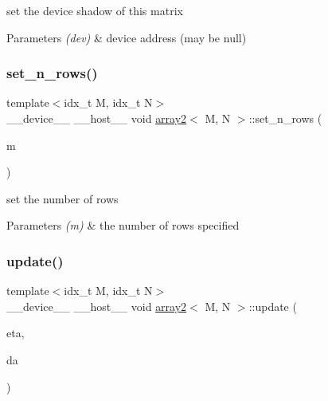set the device shadow of this matrix 


\begin{DoxyParams}{Parameters}
{\em (dev)} & device address (may be null) \\
\hline
\end{DoxyParams}
\mbox{\label{structarray2_aec446c19505f98e9e59907c5ecf726a1}} 
\subsubsection{\texorpdfstring{set\+\_\+n\+\_\+rows()}{set\_n\_rows()}}
{\footnotesize\ttfamily template$<$idx\+\_\+t M, idx\+\_\+t N$>$ \\
\+\_\+\+\_\+device\+\_\+\+\_\+ \+\_\+\+\_\+host\+\_\+\+\_\+ void \hyperlink{structarray2}{array2}$<$ M, N $>$\+::set\+\_\+n\+\_\+rows (\begin{DoxyParamCaption}\item[{\hyperlink{vgg__util_8h_a8e93478a00e685bea5e6a3f617bf03a3}{idx\+\_\+t}}]{m }\end{DoxyParamCaption})\hspace{0.3cm}{\ttfamily [inline]}}



set the number of rows 


\begin{DoxyParams}{Parameters}
{\em (m)} & the number of rows specified \\
\hline
\end{DoxyParams}
\mbox{\label{structarray2_aa7c888396fa40d51470edc745657326a}} 
\subsubsection{\texorpdfstring{update()}{update()}}
{\footnotesize\ttfamily template$<$idx\+\_\+t M, idx\+\_\+t N$>$ \\
\+\_\+\+\_\+device\+\_\+\+\_\+ \+\_\+\+\_\+host\+\_\+\+\_\+ void \hyperlink{structarray2}{array2}$<$ M, N $>$\+::update (\begin{DoxyParamCaption}\item[{\hyperlink{vgg__util_8h_a1082d08aaa761215ec83e7149f27ad16}{real}}]{eta,  }\item[{\hyperlink{structarray2}{array2}$<$ M, N $>$ \&}]{da }\end{DoxyParamCaption})\hspace{0.3cm}{\ttfamily [inline]}}



